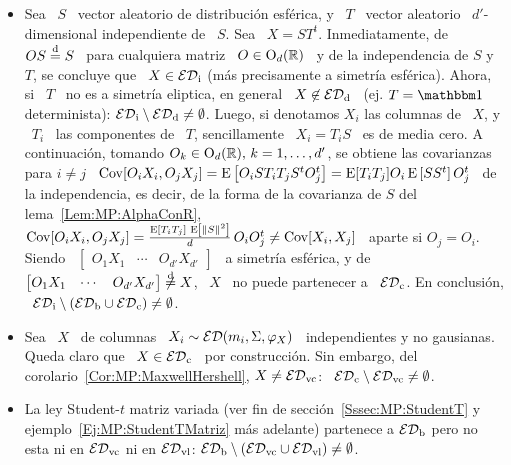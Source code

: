 \begin{itemize}
\item  Sea \ $S$  \ vector  aleatorio de  distribuci\'on esf\'erica,  y \  $T$ \
  vector  aleatorio \  $d'$-dimensional independiente  de \  $S$. Sea  \ $X  = S
  T^t$. Inmediatamente, de  \ $O S \stackrel{\mathrm{d}}{=}  S$ \ para cualquiera matriz  \ $O \in
  \mathrm{O}_d(\mathbb{R})$ \ y de la independencia de  $S$ y $T$, se concluye que \ $X \in
  \mathcal{ED}_{\mathrm{i}}$ (m\'as precisamente  a simetr\'ia esf\'erica). Ahora, si  \ $T$ \ no
  es a simetr\'ia eliptica,  en general \ $X \not\in \mathcal{ED}_{\mathrm{d}}$ \  (ej. $T = \un$
  determinista):  $\mathcal{ED}_{\mathrm{i}}  \setminus  \mathcal{ED}_{\mathrm{d}}  \neq  \emptyset$.   Luego,  si
  denotamos $X_i$ las columnas  de \ $X$, y \ $T_i$ \  las componentes de \ $T$,
  sencillamente \ $X_i  = T_i S$ \ es de media  cero.  A continuaci\'on, tomando
  $O_k \in  \mathrm{O}_d(\mathbb{R}), \, k  = 1, \ldots  , d'$, se obtiene  las covarianzas
  para $i \ne j$ \ $\operatorname{Cov}[O_i X_i , O_j X_j] = \operatorname{E}\left[ O_i S T_i T_j S^t O_j^t
  \right]  =  \operatorname{E}[T_i  T_j]  O_i  \operatorname{E}\left[  S S^t  \right]  O_j^t$  \  de  la
  independencia,  es   decir,  de  la  forma   de  la  covarianza   de  $S$  del
  lema~\ref{Lem:MP:AlphaConR}, $\operatorname{Cov}[O_i  X_i , O_j X_j]  = \frac{\operatorname{E}\left[ T_i
      T_j \right] \, \operatorname{E}\left[ \|S\|^2  \right]}{d} \, O_i O_j^t \ne \operatorname{Cov}[X_i ,
  X_j]$ \ aparte si  $O_j = O_i$.  Siendo \ $\begin{bmatrix} O_1  X_1 & \cdots &
    O_{d'}   X_{d'}  \end{bmatrix}$   \  a   simetr\'ia  esf\'erica,   y   de  \
  $\begin{bmatrix} O_1 X_1 & \cdots  & O_{d'} X_{d'} \end{bmatrix} \not\stackrel{\mathrm{d}}{=} X$,
  \ $X$  \ no  puede partenecer  a \ $\mathcal{ED}_{\mathrm{c}}$.   En conclusi\'on,  \ $\mathcal{ED}_{\mathrm{i}}
  \setminus \left( \mathcal{ED}_{\mathrm{b}} \cup \mathcal{ED}_{\mathrm{c}} \right) \neq \emptyset$.
%
\item Sea  \ $X$ \  de columnas \  $X_i \sim \mathcal{ED}( m_i  , \Sigma ,  \varphi_X)$ \
  independientes  y no  gausianas.  Queda  claro que  \ $X  \in \mathcal{ED}_{\mathrm{c}}$  \ por
  construcci\'on.   Sin embargo, del  corolario~\ref{Cor:MP:MaxwellHershell}, $X
  \ne \mathcal{ED}_{\mathrm{vc}}$: \ $\mathcal{ED}_{\mathrm{c}} \setminus \mathcal{ED}_{\mathrm{vc}} \ne \emptyset$.
%
\item     La    ley     Student-$t$     matriz    variada     (ver    fin     de
  secci\'on~\ref{Sssec:MP:StudentT}  y  ejemplo~\ref{Ej:MP:StudentTMatriz} m\'as
  adelante)  partenece  a  $\mathcal{ED}_{\mathrm{b}}$ pero  no  esta  ni  en $\mathcal{ED}_{\mathrm{vc}}$  ni  en
  $\mathcal{ED}_{\mathrm{vl}}$:  $\mathcal{ED}_{\mathrm{b}}  \setminus  \left(  \mathcal{ED}_{\mathrm{vc}}  \cup
    \mathcal{ED}_{\mathrm{vl}} \right) \neq \emptyset$.
%
\end{itemize}
